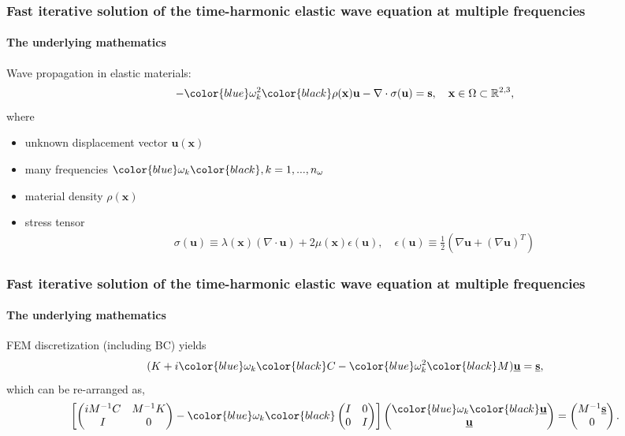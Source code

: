 \documentclass{beamer}
\begin{document}
\begin{frame}
\frametitle{Fast iterative solution of the time-harmonic elastic wave equation at multiple frequencies}
\framesubtitle{The underlying mathematics}
Wave propagation in elastic materials:
\begin{align*}
 -\color{blue}\omega_k^2\color{black} \rho(\mathbf{x}) \mathbf{u} - \nabla \cdot \sigma(\mathbf{u}) = \mathbf{s}, \quad \mathbf{x} \in \Omega \subset \mathbb{R}^{2,3},
\end{align*}
where
\begin{itemize}
 \item unknown displacement vector $\mathbf{u}(\mathbf{x})$
 \pause
 \item many frequencies $\color{blue}\omega_k\color{black}, k=1,...,n_\omega$
 \pause
 \item material density $\rho(\mathbf{x})$
 \pause
 \item stress tensor
 \begin{align*}
   \sigma(\mathbf{u}) \equiv \lambda(\mathbf{x}) \left( \nabla \cdot \mathbf{u} \right) + 2 \mu(\mathbf{x}) \epsilon(\mathbf{u}), \quad  \epsilon(\mathbf{u}) \equiv \frac{1}{2} \left( \nabla \mathbf{u} + \left( \nabla \mathbf{u}\right)^T \right)
 \end{align*}
\end{itemize}

\end{frame}

\begin{frame}
\frametitle{Fast iterative solution of the time-harmonic elastic wave equation at multiple frequencies}
\framesubtitle{The underlying mathematics}
FEM discretization (including BC) yields
\begin{align*}
(K + i \color{blue}\omega_k\color{black} C - \color{blue}\omega_k^2\color{black} M)\underline{\mathbf{u}} = \underline{\mathbf{s}},
\end{align*}
which can be re-arranged as,
\begin{align*}
\left[\begin{pmatrix} i M^{-1}C & M^{-1}K \\ I & 0\end{pmatrix} - \color{blue}\omega_k\color{black} \begin{pmatrix} I & 0 \\ 0 & I\end{pmatrix} \right] \begin{pmatrix} \color{blue}\omega_k\color{black} \underline{\mathbf{u}} \\  \underline{\mathbf{u}}\end{pmatrix} = \begin{pmatrix} M^{-1}\underline{\mathbf{s}} \\ 0\end{pmatrix}.
\end{align*}
\end{frame}
\end{document}
